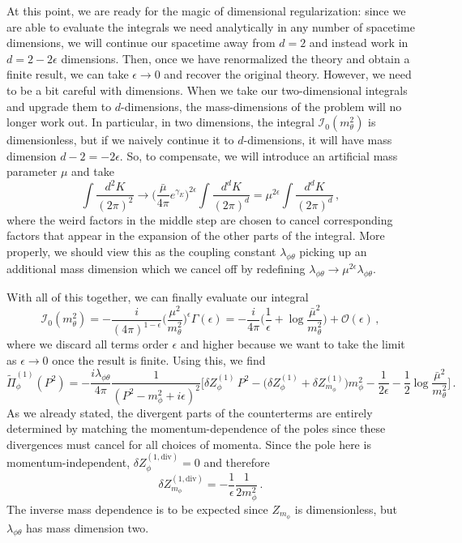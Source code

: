 \documentclass{article}
\newcommand{\td}[1]{\tilde{#1}}
\numberwithin{equation}{subsection}
\begin{document}
At this point, we are ready for the magic of dimensional regularization: since we are able to evaluate the integrals we need analytically in any number of spacetime dimensions, 
we will continue our spacetime away from $d =2$ and instead work in $d = 2-2\epsilon$ dimensions. Then, once we have renormalized the theory and obtain a finite result, we can 
take $\epsilon\to 0$ and recover the original theory. However, we need to be a bit careful with dimensions. When we take our two-dimensional integrals and upgrade them to $d$-dimensions, 
the mass-dimensions of the problem will no longer work out. In particular, in two dimensions, the integral $\mathcal{I}_0(m_\theta^2)$ is dimensionless, but if we naively continue it to $d$-dimensions, 
it will have mass dimension $d-2 = -2\epsilon$. So, to compensate, we will introduce an artificial mass parameter $\mu$ and take
\begin{equation}
    \int\frac{d^2K}{(2\pi)^2} \to \Big(\frac{\bar \mu}{4\pi}e^{\gamma_E}\Big)^{2\epsilon}\int\frac{d^dK}{(2\pi)^d} = \mu^{2\epsilon}\int\frac{d^dK}{(2\pi)^d}\,,
\end{equation}
where the weird factors in the middle step are chosen to cancel corresponding factors that appear in the expansion of the other parts of the integral. More properly, we should 
view this as the coupling constant $\lambda_{\phi\theta}$ picking up an additional mass dimension which we cancel off by redefining
$\lambda_{\phi\theta}\to \mu^{2\epsilon}\lambda_{\phi\theta}$.

With all of this together, we can finally evaluate our integral
\begin{equation}
    \mathcal{I}_0(m_\theta^2) = -\frac{i}{(4\pi)^{1 - \epsilon}}\Big(\frac{\mu^2}{m_\theta^2}\Big)^\epsilon\Gamma(\epsilon) = -\frac{i}{4\pi}\Big(\frac{1}{\epsilon} 
	+ \log\frac{\bar{\mu}^2}{m_\theta^2}\Big) + \mathcal{O}(\epsilon)\,,
\end{equation}
where we discard all terms order $\epsilon$ and higher because we want to take the limit as $\epsilon\to 0$ once the result is finite. Using this, we find
\begin{equation}
    \td\Pi^{(1)}_\phi(P^2) = -\frac{i\lambda_{\phi\theta}}{4\pi}\frac{1}{(P^2 - m_\phi^2 + i\epsilon)^2}\Bigg[\delta Z_\phi^{(1)}\,P^2 - \Big(\delta Z_\phi^{(1)} 
	+ \delta Z_{m_\phi}^{(1)}\Big)m_\phi^2 - \frac{1}{2\epsilon} - \frac{1}{2}\log\frac{\bar\mu^2}{m_\theta^2}\Bigg]\,.
\end{equation}
As we already stated, the divergent parts of the counterterms are entirely determined by matching the momentum-dependence of the poles since these divergences must cancel for 
all choices of momenta. Since the pole here is momentum-independent, $\delta Z_\phi^{(1,\text{div})} = 0$ and therefore
\begin{equation}
    \delta Z_{m_\phi}^{(1,\text{div})} = -\frac{1}{\epsilon}\frac{1}{2m_\phi^2}\,.
\end{equation}
The inverse mass dependence is to be expected since $Z_{m_\phi}$ is dimensionless, but $\lambda_{\phi\theta}$ has mass dimension two.
\end{document}
